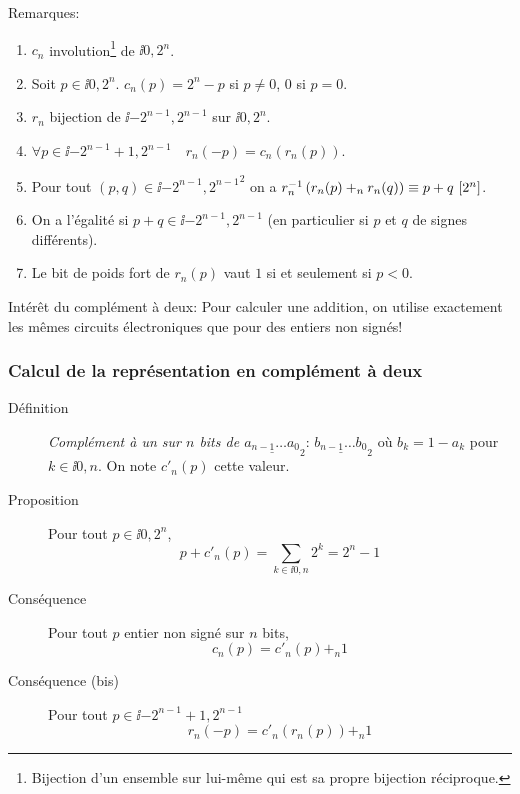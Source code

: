 Remarques:
\begin{enumerate}
\item $c_{n}$ involution\footnote{Bijection
    d'un ensemble sur lui-même qui est sa propre bijection
    réciproque.}
  de $\ii{0,2^{n}}$.
\item Soit $p\in \ii{0,2^{n}}$. $c_{n}(p)=2^{n}-p$ si $p\neq 0$, $0$
  si $p=0$.
\item $r_{n}$  bijection de $\ii{-2^{n-1},2^{n-1}}$ sur
  $\ii{0,2^{n}}$.
\item $\forall p\in \ii{-2^{n-1}+1,2^{n-1}}\quad r_{n}(-p) = c_{n}(r_{n}(p))$.
\item Pour tout $(p,q)\in\ii{-2^{n-1},2^{n-1}}^{2}$ on a
  $r_{n}^{-1}\left( r_{n}(p)+_{n}r_{n}(q)\right) \equiv p+q \ [2^{n}]$.
\item On a l'égalité si $p+q\in \ii{-2^{n-1},2^{n-1}}$ (en
  particulier si $p$ et $q$ de signes différents).
\item Le bit de poids fort de $r_{n}(p)$
  vaut $1$ si et seulement si $p<0$.
\end{enumerate}

Intérêt du complément à deux: Pour calculer une addition, on utilise
exactement les mêmes circuits électroniques que pour des entiers non
signés!

\subsubsection{Calcul de la représentation en complément à deux}

\begin{description}
\item[Définition] \emph{Complément à un sur $n$ bits de
  $\underline{a_{n-1}\ldots a_{0}}_{2}$}:
  $\underline{b_{n-1}\ldots b_{0}}_{2}$ où $b_{k}=1-a_{k}$ pour
  $k\in\ii{0,n}$. On note $c'_{n}(p)$ cette valeur.
\item[Proposition] Pour tout $p\in\ii{0,2^{n}}$,
  \begin{equation*}
   p + c'_{n}(p) = \sum_{k\in\ii{0,n}}2^{k}= 2^{n}-1 
  \end{equation*}
\item[Conséquence] Pour tout $p$ entier non signé sur $n$ bits,
  \begin{equation*}
    c_{n}(p) = c'_{n}(p) +_{n} 1 
  \end{equation*}
\item[Conséquence (bis)] Pour tout $p\in\ii{-2^{n-1}+1,2^{n-1}}$
  \begin{equation*}
    r_{n}(-p) = c'_{n}(r_{n}(p)) +_{n} 1
  \end{equation*}
\end{description}

